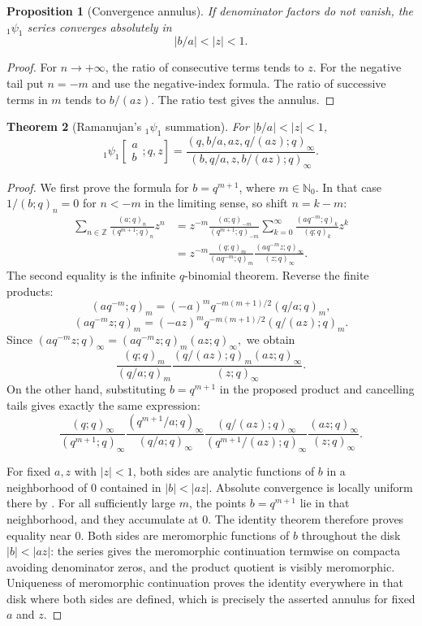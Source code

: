 \documentclass[11pt,oneside,openany]{book}
\newtheorem{theorem}{Theorem}[chapter]
\newtheorem{proposition}[theorem]{Proposition}
\theoremstyle{definition}
\theoremstyle{remark}
\newcommand{\Z}{\mathbb Z}
\newcommand{\N}{\mathbb N}
\newcommand{\abs}[1]{\lvert #1\rvert}
\begin{document}
\begin{proposition}[Convergence annulus]\label{prop:1psi1-convergence}
If denominator factors do not vanish, the ${}_1\psi_1$ series converges absolutely in
\[
 \abs{b/a}<\abs z<1.
\]
\end{proposition}

\begin{proof}
For $n\to+\infty$, the ratio of consecutive terms tends to $z$.  For the negative tail put $n=-m$ and use the negative-index formula.  The ratio of successive terms in $m$ tends to $b/(az)$.  The ratio test gives the annulus.
\end{proof}

\begin{theorem}[Ramanujan's ${}_1\psi_1$ summation]\label{thm:1psi1}
For $\abs{b/a}<\abs z<1$,
\[
 {}_1\psi_1\!\left[\begin{matrix}a\\b\end{matrix};q,z\right]
 =\frac{(q,b/a,az,q/(az);q)_\infty}
 {(b,q/a,z,b/(az);q)_\infty}.
\]
\end{theorem}

\begin{proof}
We first prove the formula for $b=q^{m+1}$, where $m\in\N_0$.  In that case $1/(b;q)_n=0$ for $n<-m$ in the limiting sense, so shift $n=k-m$:
\begin{align*}
 \sum_{n\in\Z}\frac{(a;q)_n}{(q^{m+1};q)_n}z^n
 &=z^{-m}\frac{(a;q)_{-m}}{(q^{m+1};q)_{-m}}
 \sum_{k=0}^{\infty}\frac{(aq^{-m};q)_k}{(q;q)_k}z^k\\
 &=z^{-m}\frac{(q;q)_m}{(aq^{-m};q)_m}
 \frac{(aq^{-m}z;q)_\infty}{(z;q)_\infty}.
\end{align*}
The second equality is the infinite $q$-binomial theorem.  Reverse the finite products:
\[
 (aq^{-m};q)_m=(-a)^mq^{-m(m+1)/2}(q/a;q)_m,
\]
\[
 (aq^{-m}z;q)_m=(-az)^mq^{-m(m+1)/2}(q/(az);q)_m.
\]
Since
\(
 (aq^{-m}z;q)_\infty=(aq^{-m}z;q)_m(az;q)_\infty,
\)
we obtain
\[
 \frac{(q;q)_m}{(q/a;q)_m}
 \frac{(q/(az);q)_m(az;q)_\infty}{(z;q)_\infty}.
\]
On the other hand, substituting $b=q^{m+1}$ in the proposed product and cancelling tails gives exactly the same expression:
\[
 \frac{(q;q)_\infty}{(q^{m+1};q)_\infty}
 \frac{(q^{m+1}/a;q)_\infty}{(q/a;q)_\infty}
 \frac{(q/(az);q)_\infty}{(q^{m+1}/(az);q)_\infty}
 \frac{(az;q)_\infty}{(z;q)_\infty}.
\]

For fixed $a,z$ with $\abs z<1$, both sides are analytic functions of $b$ in a neighborhood of $0$ contained in $\abs b<\abs{az}$.  Absolute convergence is locally uniform there by .  For all sufficiently large $m$, the points $b=q^{m+1}$ lie in that neighborhood, and they accumulate at $0$.  The identity theorem therefore proves equality near $0$.  Both sides are meromorphic functions of $b$ throughout the disk $\abs b<\abs{az}$: the series gives the meromorphic continuation termwise on compacta avoiding denominator zeros, and the product quotient is visibly meromorphic.  Uniqueness of meromorphic continuation proves the identity everywhere in that disk where both sides are defined, which is precisely the asserted annulus for fixed $a$ and $z$.
\end{proof}
\end{document}
